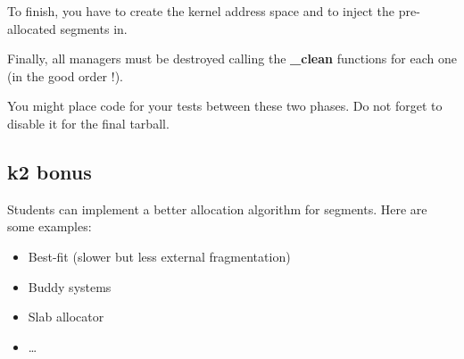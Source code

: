 To finish, you  have to create the kernel address  space and to inject
the pre-allocated segments in.

Finally, all  managers must be destroyed  calling the \textbf{\_clean}
functions for each one (in the good order !).

You might place  code for your tests between these  two phases. Do not
forget to disable it for the final tarball.

%
%

\subsection{k2 bonus}

Students can implement a better allocation algorithm for
segments. Here are some examples:

\begin{itemize}

\item Best-fit (slower but less external fragmentation)
\item Buddy systems
\item Slab allocator
\item \ldots

\end{itemize}
